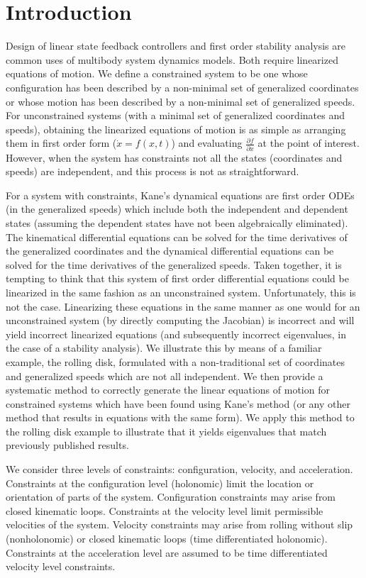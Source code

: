 \documentclass[smallcondensed,final]{svjour3}                     %
\begin{document}
\section{Introduction}
\label{sec:intro}
Design of linear state feedback controllers and first order stability analysis
are common uses of multibody system dynamics models. Both require linearized
equations of motion.  We define a constrained system to be one whose
configuration has been described by a non-minimal set of generalized
coordinates or whose motion has been described by a non-minimal set of
generalized speeds.  For unconstrained systems (with a minimal set of
generalized coordinates and speeds), obtaining the linearized equations of
motion is as simple as arranging them in first order form ($\dot{x} = f(x, t)$)
and evaluating $\frac{\partial f}{\partial x}$ at the point of interest.
However, when the system has constraints not all the states (coordinates and
speeds) are independent, and this process is not as straightforward.

For a system with constraints, Kane's dynamical equations\cite{Kane1985} are
first order ODEs (in the generalized speeds) which include both the independent
and dependent states (assuming the dependent states have not been algebraically
eliminated). The kinematical differential equations can be solved for the time
derivatives of the generalized coordinates and the dynamical differential
equations can be solved for the time derivatives of the generalized speeds.
Taken together, it is tempting to think that this system of first order
differential equations could be linearized in the same fashion as an
unconstrained system.  Unfortunately, this is not the case.  Linearizing these
equations in the same manner as one would for an unconstrained system (by
directly computing the Jacobian) is incorrect and will yield incorrect
linearized equations (and subsequently incorrect eigenvalues, in the case of a
stability analysis). We illustrate this by means of a familiar example, the
rolling disk, formulated with a non-traditional set of coordinates and
generalized speeds which are not all independent. We then provide a systematic
method to correctly generate the linear equations of motion for constrained
systems which have been found using Kane's method (or any other method that
results in equations with the same form). We apply this method to the rolling
disk example to illustrate that it yields eigenvalues that match previously
published results.

We consider three levels of constraints: configuration, velocity, and
acceleration. Constraints at the configuration level (holonomic) limit the
location or orientation of parts of the system. Configuration constraints may
arise from closed kinematic loops. Constraints at the velocity level limit
permissible velocities of the system. Velocity constraints may arise from
rolling without slip (nonholonomic) or closed kinematic loops (time
differentiated holonomic).  Constraints at the acceleration level are assumed
to be time differentiated velocity level constraints.
\end{document}
